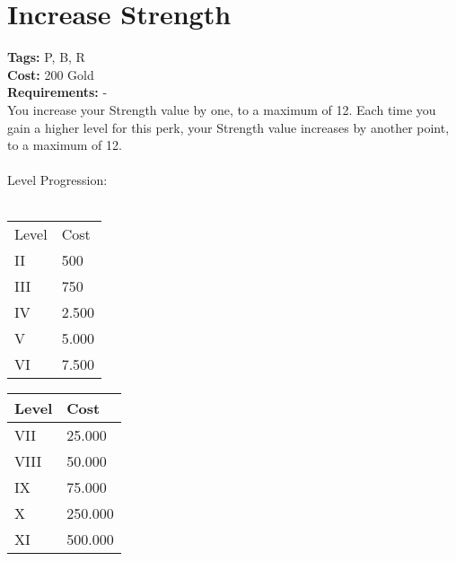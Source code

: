\section{Increase Strength}\label{sec:increasestrength}
\textbf{Tags:} P, B, R\\
\textbf{Cost:} 200 Gold\\
\textbf{Requirements:} -\\
You increase your Strength value by one, to a maximum of 12.
Each time you gain a higher level for this perk, your Strength value increases by another point, to a maximum of 12.\\
\\
Level Progression:\\
\\
\begin{minipage}{0.5\textwidth}
    \begin{tabular}{l | l}
        Level & Cost\\
        II & 500\\
        III & 750\\
        IV & 2.500\\
        V & 5.000\\
        VI & 7.500\\
    \end{tabular}
\end{minipage}
\begin{minipage}{0.5\textwidth}
    \begin{tabular}{l | l}
        Level & Cost\\ \hline
        VII & 25.000\\
        VIII & 50.000\\
        IX & 75.000\\
        X & 250.000\\
        XI & 500.000\\
    \end{tabular}
\end{minipage}

